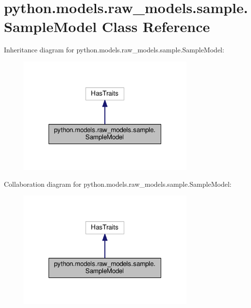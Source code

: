 \hypertarget{classpython_1_1models_1_1raw__models_1_1sample_1_1_sample_model}{\section{python.\-models.\-raw\-\_\-models.\-sample.\-Sample\-Model Class Reference}
\label{classpython_1_1models_1_1raw__models_1_1sample_1_1_sample_model}
}


Inheritance diagram for python.\-models.\-raw\-\_\-models.\-sample.\-Sample\-Model\-:
\nopagebreak
\begin{figure}[H]
\begin{center}
\leavevmode
\includegraphics[width=252pt]{classpython_1_1models_1_1raw__models_1_1sample_1_1_sample_model__inherit__graph}
\end{center}
\end{figure}


Collaboration diagram for python.\-models.\-raw\-\_\-models.\-sample.\-Sample\-Model\-:
\nopagebreak
\begin{figure}[H]
\begin{center}
\leavevmode
\includegraphics[width=252pt]{classpython_1_1models_1_1raw__models_1_1sample_1_1_sample_model__coll__graph}
\end{center}
\end{figure}
